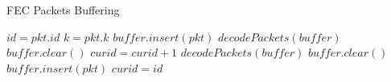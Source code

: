 
\begin{enumerate}
  \begin{algorithm}[H]
   \caption{FEC Packets Buffering}
    \label{fec_buffer}
    \begin{algorithmic}[1]
  \State ${id} = pkt.id$
  \State ${k} = pkt.k$
    \State \Return
  \EndIf
    \State $buffer.insert(pkt)$
      \State $decodePackets(buffer)$
      \State $buffer.clear()$
      \State $curid = curid + 1$
    \EndIf
  \Else
      \State $decodePackets(buffer)$
    \EndIf
    \State $buffer.clear()$
    \State $buffer.insert(pkt)$    
    \State $curid = id$
  \EndIf
\EndFunction
\end{algorithmic}
\end{algorithm}
\end{enumerate}



